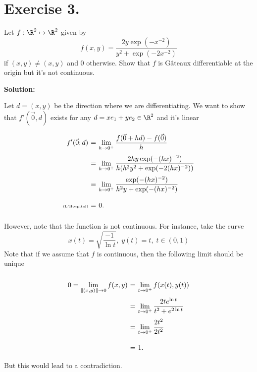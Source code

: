 \section*{Exercise 3.}

Let $f:\R^2 \mapsto \R^2$ given by 
\[ f(x,y) = \frac{2y\exp(-x^{-2})}{y^2+\exp(-2x^{-2})} \]
if $(x,y)\neq (x,y)$ and $0$ otherwise. Show that $f$ is Gâteaux differentiable at the origin but it's not continuous.

\textbf{Solution:}

Let $d = (x,y)$ be the direction where we are differentiating. We want to show that $f'(\vec{0}, d)$ exists for any $d = xe_1 + ye_2 \in \R^2$ and it's linear
\[ \everymath{\displaystyle}
\arraycolsep=1.8pt\def\arraystretch{2.5}
\begin{array}{rcl}
    f'(\vec{0};d)
     & = & \lim_{h\to 0^+} \frac{f(\vec{0}+hd)-f(\vec{0})}{h}\\
     & = & \lim_{h\to 0^+} \frac{2hy \exp(-(hx)^{-2})}{h(h^2y^2 + \exp(-2(hx)^{-2}))}\\
    & = & \lim_{h\to 0^+} \frac{\exp(-(hx)^{-2})}{h^2y + \exp(-(hx)^{-2})}\\
    \mbox{\tiny{(L'Hospital)}} & = & 0.
\end{array} \]

However, note that the function is not continuous. For instance, take the curve
\[ x(t) = \sqrt{\frac{-1}{\ln t}},\; y(t) = t,\; t \in (0,1) \]
Note that if we assume that $f$ is continuous, then the following limit should be unique
\[ \everymath{\displaystyle}
\arraycolsep=1.8pt\def\arraystretch{2.5}
\begin{array}{rcl}
    0 = \lim_{\|(x,y)\|\to 0} f(x,y) & = & \lim_{t \to 0^+} f(x(t),y(t))\\
    & = & \lim_{t \to 0^+} \frac{2te^{\ln t}}{t^2 + e^{2\ln t}}\\
    & = & \lim_{t \to 0^+} \frac{2t^2}{2t^2}\\
    & = & 1.
\end{array} \]
But this would lead to a contradiction.